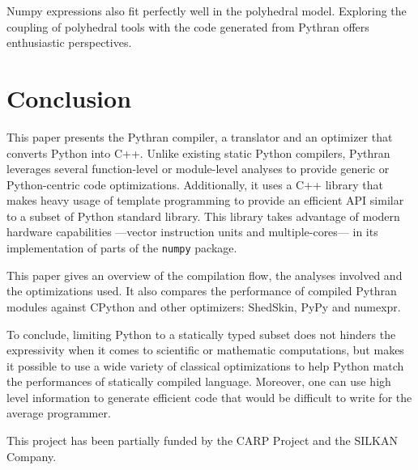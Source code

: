 \documentclass[10pt, onecolumn, preprint]{sigplanconf}
\begin{document}
Numpy expressions also fit perfectly well in the polyhedral model. Exploring
the coupling of polyhedral tools with the code generated from Pythran offers
enthusiastic perspectives.

\section{Conclusion}

This paper presents the Pythran compiler, a translator and an optimizer that
converts Python into C++. Unlike existing static Python compilers, Pythran
leverages several function-level or module-level analyses to provide
generic or Python-centric code optimizations. Additionally, it uses a C++
library that makes heavy usage of template programming to provide an efficient
API similar to a subset of Python standard library. This library takes
advantage of modern hardware capabilities ---vector instruction units and
multiple-cores--- in its implementation of parts of the \texttt{numpy} package.

This paper gives an overview of the compilation flow, the analyses involved and
the optimizations used. It also compares the performance of compiled Pythran
modules against CPython and other optimizers: ShedSkin, PyPy and numexpr.

To conclude, limiting Python to a statically typed subset does not hinders the
expressivity when it comes to scientific or mathematic computations, but makes
it possible to use a wide variety of classical optimizations to help Python
match the performances of statically compiled language. Moreover, one can use
high level information to generate efficient code that would be difficult to
write for the average programmer.



\acks

This project has been partially funded by the CARP Project and the SILKAN
Company.




\end{document}
